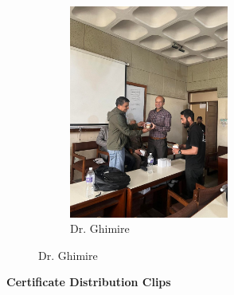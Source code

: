 \documentclass[a4paper,12pt]{report}
\begin{document}
\begin{figure}[h!]
\begin{subfigure}[t]{0.33\textwidth}
\end{subfigure}
\hfill
\begin{subfigure}[b]{0.3\textwidth}
  \includegraphics[height=7cm, width=\textwidth]{santosht.jpg}
  \caption{Dr. Ghimire}
\end{subfigure}
\end{figure}


\vspace*{10mm}
{\bfseries \large Certificate Distribution Clips}
\end{document}
